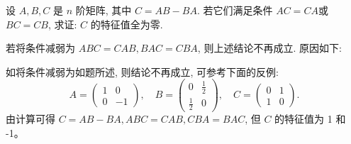 \documentclass[../../main.tex]{subfiles}
\begin{document}
\begin{proposition}\label{proposition:经典矩阵乘法可交换诱导的性质例题}
设 \(A, B, C\) 是 \(n\) 阶矩阵, 其中 \(C = AB - BA\). 若它们满足条件 $AC = CA$或 $BC = CB$, 求证: \(C\) 的特征值全为零.
\end{proposition}
\begin{remark}
若将条件减弱为 \(ABC = CAB, BAC = CBA\), 则上述结论不再成立. 原因如下:

如将条件减弱为如题所述, 则结论不再成立, 可参考下面的反例:
\[
A = \begin{pmatrix}
1 & 0 \\ 
0 & -1
\end{pmatrix}, \quad
B = \begin{pmatrix}
0 & \frac{1}{2} \\ 
\frac{1}{2} & 0
\end{pmatrix}, \quad
C = \begin{pmatrix}
0 & 1 \\ 
1 & 0
\end{pmatrix}.
\]
由计算可得 \(C = AB - BA, ABC = CAB, CBA = BAC\), 但 \(C\) 的特征值为 1 和 -1。
\end{remark}
\end{document}
